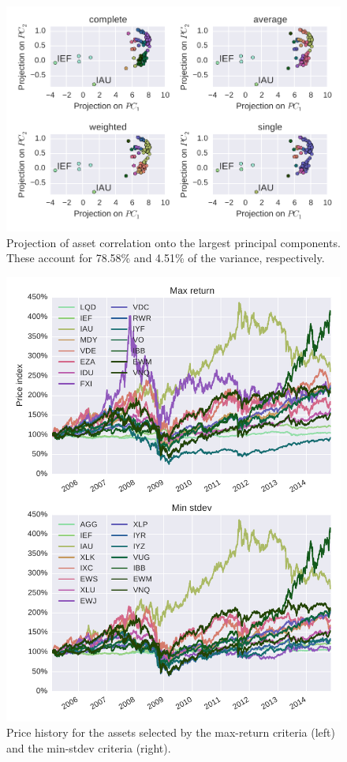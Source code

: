 \begin{figure}[tp]
\centering
\includegraphics{pic/pca_methods.pdf}
\caption{Projection of asset correlation onto the largest principal components. These account for 78.58\% and 4.51\% of the variance, respectively.}
\label{fig:pca}
\end{figure}

\begin{figure}[tp]
\centering
\includegraphics{pic/prices_selected_assets.pdf}
\caption{Price history for the assets selected by the max-return criteria (left) and the min-stdev criteria (right).}
\label{fig:prices_selected}
\end{figure}
